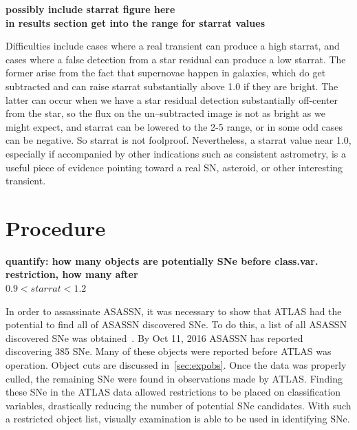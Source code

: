\documentclass[aps,prb,twocolumn,superscriptaddress]{revtex4-1}
\begin{document}
{\bf possibly include starrat figure here}\\
{\bf in results section get into the range for starrat values}

Difficulties include cases where a real transient can produce a high 
starrat, and cases where a false detection from a star residual can 
produce a low starrat. The former arise from the fact that supernovae 
happen in galaxies, which do get subtracted and can raise starrat 
substantially above 1.0 if they are bright. The latter can occur when 
we have a star residual detection substantially off-center from the 
star, so the flux on the un--subtracted image is not as bright as we might 
expect, and starrat can be lowered to the 2-5 range, or in some odd 
cases can be negative. So starrat is not foolproof. Nevertheless, a 
starrat value near 1.0, especially if accompanied by other indications 
such as consistent astrometry, is a useful piece of evidence pointing 
toward a real SN, asteroid, or other interesting transient.






\section{Procedure}
{\bf quantify: how many objects are potentially SNe before class.var. restriction, how many after\\
$0.9 < starrat < 1.2$\\}

\indent In order to assassinate ASASSN, 
it was necessary to show that ATLAS had the potential to find all of ASASSN discovered SNe. 
To do this, a list of all ASASSN discovered SNe was obtained~\cite{asn_data}. 
By Oct 11, 2016 
ASASSN has reported discovering 385 SNe. Many of these 
objects were reported before ATLAS was operation. Object cuts are discussed 
in~\cref{sec:expobs}. Once the data was properly culled, the remaining SNe 
were found in observations made by ATLAS. 
Finding these SNe in the ATLAS 
data allowed restrictions to be placed on classification variables, drastically 
reducing the number of potential SNe candidates. With such a restricted object 
list, visually examination is able to be used in identifying SNe.\\ 
\end{document}
